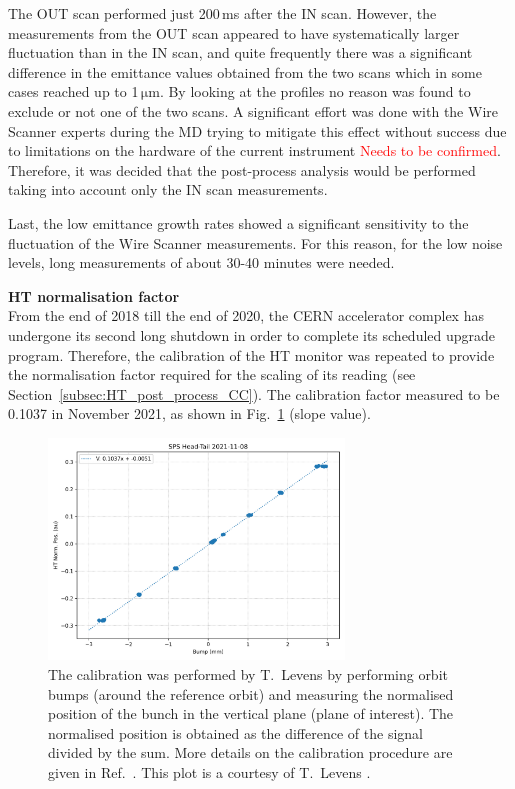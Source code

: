 The OUT scan performed just 200\,ms after the IN scan. However, the measurements from the OUT scan appeared to have systematically larger fluctuation than in the IN scan, and quite frequently there was a significant difference in the emittance values obtained from the two scans which in some cases reached up to 1\,$\mathrm{\mu m}$. By looking at the profiles no reason was found to exclude or not one of the two scans. A significant effort was done with the Wire Scanner experts during the MD trying to mitigate this effect without success due to limitations on the hardware of the current instrument \textcolor{red}{Needs to be confirmed}. Therefore, it was decided that the post-process analysis would be performed taking into account only the IN scan measurements.

Last, the low emittance growth rates showed a significant sensitivity to the fluctuation of the Wire Scanner measurements. For this reason, for the low noise levels, long measurements of about 30-40 minutes were needed.

\textbf{HT normalisation factor}\\
From the end of 2018 till the end of 2020, the CERN accelerator complex has undergone its second long shutdown in order to complete its scheduled upgrade program. Therefore, the calibration of the HT monitor was repeated to provide the normalisation factor required for the scaling of its reading (see Section~\ref{subsec:HT_post_process_CC}). The calibration factor measured to be 0.1037 in November 2021, as shown in Fig.~\ref{fig:HT_calibration_2022_levens} (slope value).

\begin{figure}[!h] %
    \centering         
    \includegraphics[width=0.7\textwidth]{images/Ch8/HT_monitor_calibration_2022.png}
        \caption{The calibration was performed by T.~Levens by performing orbit bumps (around the reference orbit) and measuring the normalised position of the bunch in the vertical plane (plane of interest). The normalised position is obtained as the difference of the signal divided by the sum. More details on the calibration procedure are given in Ref.~\cite{PhysRevAccelBeams.22.112803}. This plot is a courtesy of T.~Levens .}
        \label{fig:HT_calibration_2022_levens}
 \end{figure}



